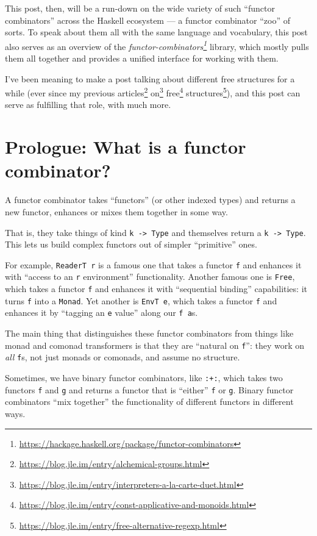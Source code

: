 \documentclass[]{article}
\renewcommand{\href}[2]{#2\footnote{\url{#1}}}
\begin{document}
This post, then, will be a run-down on the wide variety of such ``functor
combinators'' across the Haskell ecosystem --- a functor combinator ``zoo'' of
sorts. To speak about them all with the same language and vocabulary, this post
also serves as an overview of the
\emph{\href{https://hackage.haskell.org/package/functor-combinators}{functor-combinators}}
library, which mostly pulls them all together and provides a unified interface
for working with them.

I've been meaning to make a post talking about different free structures for a
while (ever since my previous
\href{https://blog.jle.im/entry/alchemical-groups.html}{articles}
\href{https://blog.jle.im/entry/interpreters-a-la-carte-duet.html}{on}
\href{https://blog.jle.im/entry/const-applicative-and-monoids.html}{free}
\href{https://blog.jle.im/entry/free-alternative-regexp.html}{structures}), and
this post can serve as fulfilling that role, with much more.

\hypertarget{prologue-what-is-a-functor-combinator}{%
\section{Prologue: What is a functor
combinator?}\label{prologue-what-is-a-functor-combinator}}

A functor combinator takes ``functors'' (or other indexed types) and returns a
new functor, enhances or mixes them together in some way.

That is, they take things of kind \texttt{k\ -\textgreater{}\ Type} and
themselves return a \texttt{k\ -\textgreater{}\ Type}. This lets us build
complex functors out of simpler ``primitive'' ones.

For example, \texttt{ReaderT\ r} is a famous one that takes a functor \texttt{f}
and enhances it with ``access to an \texttt{r} environment'' functionality.
Another famous one is \texttt{Free}, which takes a functor \texttt{f} and
enhances it with ``sequential binding'' capabilities: it turns \texttt{f} into a
\texttt{Monad}. Yet another is \texttt{EnvT\ e}, which takes a functor
\texttt{f} and enhances it by ``tagging an \texttt{e} value'' along our
\texttt{f\ a}s.

The main thing that distinguishes these functor combinators from things like
monad and comonad transformers is that they are ``natural on \texttt{f}'': they
work on \emph{all} \texttt{f}s, not just monads or comonads, and assume no
structure.

Sometimes, we have binary functor combinators, like \texttt{:+:}, which takes
two functors \texttt{f} and \texttt{g} and returns a functor that is ``either''
\texttt{f} or \texttt{g}. Binary functor combinators ``mix together'' the
functionality of different functors in different ways.
\end{document}
